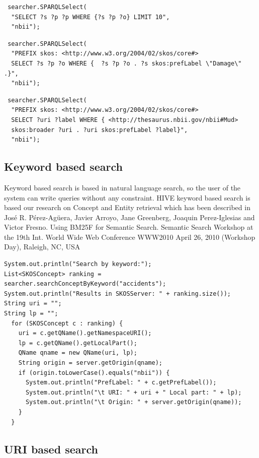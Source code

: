 \begin{verbatim}
 searcher.SPARQLSelect(
  "SELECT ?s ?p ?p WHERE {?s ?p ?o} LIMIT 10", 
  "nbii");
\end{verbatim}

\begin{verbatim}
 searcher.SPARQLSelect(
  "PREFIX skos: <http://www.w3.org/2004/02/skos/core#> 
  SELECT ?s ?p ?o WHERE {  ?s ?p ?o . ?s skos:prefLabel \"Damage\" .}",
  "nbii");
\end{verbatim}

\begin{verbatim}
 searcher.SPARQLSelect(
  "PREFIX skos: <http://www.w3.org/2004/02/skos/core#> 
  SELECT ?uri ?label WHERE { <http://thesaurus.nbii.gov/nbii#Mud> 
  skos:broader ?uri . ?uri skos:prefLabel ?label}",
  "nbii");
\end{verbatim}

\subsection{Keyword based search}

Keyword based search is based in natural language search, so the user of the system can write queries without any constraint. HIVE keyword 
based search is based our research on Concept and Entity retrieval which has been described in José R. Pérez-Agüera, Javier Arroyo, 
Jane Greenberg, Joaquin Perez-Iglesias and Victor Fresno. Using BM25F for Semantic Search. Semantic Search Workshop at the 19th Int. 
World Wide Web Conference WWW2010 April 26, 2010 (Workshop Day), Raleigh, NC, USA

\begin{verbatim}
System.out.println("Search by keyword:");
List<SKOSConcept> ranking = searcher.searchConceptByKeyword("accidents");
System.out.println("Results in SKOSServer: " + ranking.size());
String uri = "";
String lp = "";
  for (SKOSConcept c : ranking) {
    uri = c.getQName().getNamespaceURI();
    lp = c.getQName().getLocalPart();
    QName qname = new QName(uri, lp);
    String origin = server.getOrigin(qname);
    if (origin.toLowerCase().equals("nbii")) {
      System.out.println("PrefLabel: " + c.getPrefLabel());
      System.out.println("\t URI: " + uri + " Local part: " + lp);
      System.out.println("\t Origin: " + server.getOrigin(qname));
    }
  }
\end{verbatim}

\subsection{URI based search}

